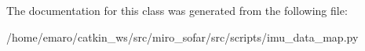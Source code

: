 The documentation for this class was generated from the following file\+:\begin{DoxyCompactItemize}
\item 
/home/emaro/catkin\+\_\+ws/src/miro\+\_\+sofar/src/scripts/imu\+\_\+data\+\_\+map.\+py\end{DoxyCompactItemize}
